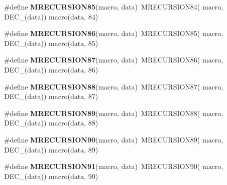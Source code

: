 \begin{DoxyCompactItemize}
\item 
\hypertarget{group__group__sam0__utils__mrecursion_ga7f31385ab7859d5e8d37703595b2162a}{}\#define {\bfseries M\+R\+E\+C\+U\+R\+S\+I\+O\+N85}(macro,  data)~M\+R\+E\+C\+U\+R\+S\+I\+O\+N84(  macro, D\+E\+C\+\_\+(data))   macro(data, 84)\label{group__group__sam0__utils__mrecursion_ga7f31385ab7859d5e8d37703595b2162a}

\item 
\hypertarget{group__group__sam0__utils__mrecursion_gac51f17bf8f61be0fe68a40cdaca97002}{}\#define {\bfseries M\+R\+E\+C\+U\+R\+S\+I\+O\+N86}(macro,  data)~M\+R\+E\+C\+U\+R\+S\+I\+O\+N85(  macro, D\+E\+C\+\_\+(data))   macro(data, 85)\label{group__group__sam0__utils__mrecursion_gac51f17bf8f61be0fe68a40cdaca97002}

\item 
\hypertarget{group__group__sam0__utils__mrecursion_gac2d7de404d632efc644ba343ae3bdafc}{}\#define {\bfseries M\+R\+E\+C\+U\+R\+S\+I\+O\+N87}(macro,  data)~M\+R\+E\+C\+U\+R\+S\+I\+O\+N86(  macro, D\+E\+C\+\_\+(data))   macro(data, 86)\label{group__group__sam0__utils__mrecursion_gac2d7de404d632efc644ba343ae3bdafc}

\item 
\hypertarget{group__group__sam0__utils__mrecursion_ga7a218f615f598fbbc92149ac191c3003}{}\#define {\bfseries M\+R\+E\+C\+U\+R\+S\+I\+O\+N88}(macro,  data)~M\+R\+E\+C\+U\+R\+S\+I\+O\+N87(  macro, D\+E\+C\+\_\+(data))   macro(data, 87)\label{group__group__sam0__utils__mrecursion_ga7a218f615f598fbbc92149ac191c3003}

\item 
\hypertarget{group__group__sam0__utils__mrecursion_ga4aaba445e78b860dbe24197f48bab4b2}{}\#define {\bfseries M\+R\+E\+C\+U\+R\+S\+I\+O\+N89}(macro,  data)~M\+R\+E\+C\+U\+R\+S\+I\+O\+N88(  macro, D\+E\+C\+\_\+(data))   macro(data, 88)\label{group__group__sam0__utils__mrecursion_ga4aaba445e78b860dbe24197f48bab4b2}

\item 
\hypertarget{group__group__sam0__utils__mrecursion_gaaf8d19004bc883b73606eec23ce0e29a}{}\#define {\bfseries M\+R\+E\+C\+U\+R\+S\+I\+O\+N90}(macro,  data)~M\+R\+E\+C\+U\+R\+S\+I\+O\+N89(  macro, D\+E\+C\+\_\+(data))   macro(data, 89)\label{group__group__sam0__utils__mrecursion_gaaf8d19004bc883b73606eec23ce0e29a}

\item 
\hypertarget{group__group__sam0__utils__mrecursion_ga07bd82d35c4d64112e70c61028ce1580}{}\#define {\bfseries M\+R\+E\+C\+U\+R\+S\+I\+O\+N91}(macro,  data)~M\+R\+E\+C\+U\+R\+S\+I\+O\+N90(  macro, D\+E\+C\+\_\+(data))   macro(data, 90)\label{group__group__sam0__utils__mrecursion_ga07bd82d35c4d64112e70c61028ce1580}


\end{DoxyCompactItemize}
